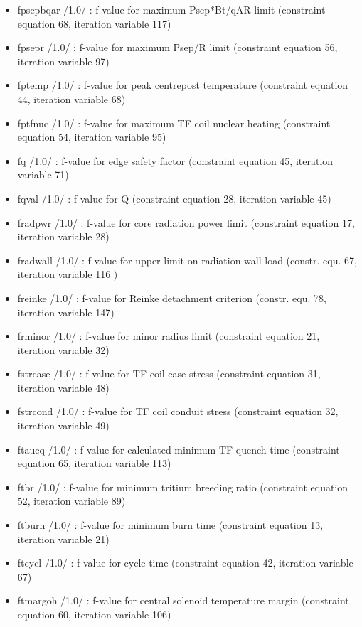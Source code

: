 \documentclass[
]{article}
\begin{document}
\begin{itemize}
\begin{itemize}
  \item
    fpsepbqar /1.0/ : f-value for maximum Psep*Bt/qAR limit (constraint
    equation 68, iteration variable 117)
  \item
    fpsepr /1.0/ : f-value for maximum Psep/R limit (constraint equation
    56, iteration variable 97)
  \item
    fptemp /1.0/ : f-value for peak centrepost temperature (constraint
    equation 44, iteration variable 68)
  \item
    fptfnuc /1.0/ : f-value for maximum TF coil nuclear heating
    (constraint equation 54, iteration variable 95)
  \item
    fq /1.0/ : f-value for edge safety factor (constraint equation 45,
    iteration variable 71)
  \item
    fqval /1.0/ : f-value for Q (constraint equation 28, iteration
    variable 45)
  \item
    fradpwr /1.0/ : f-value for core radiation power limit (constraint
    equation 17, iteration variable 28)
  \item
    fradwall /1.0/ : f-value for upper limit on radiation wall load
    (constr. equ. 67, iteration variable 116 )
  \item
    freinke /1.0/ : f-value for Reinke detachment criterion (constr.
    equ. 78, iteration variable 147)
  \item
    frminor /1.0/ : f-value for minor radius limit (constraint equation
    21, iteration variable 32)
  \item
    fstrcase /1.0/ : f-value for TF coil case stress (constraint
    equation 31, iteration variable 48)
  \item
    fstrcond /1.0/ : f-value for TF coil conduit stress (constraint
    equation 32, iteration variable 49)
  \item
    ftaucq /1.0/ : f-value for calculated minimum TF quench time
    (constraint equation 65, iteration variable 113)
  \item
    ftbr /1.0/ : f-value for minimum tritium breeding ratio (constraint
    equation 52, iteration variable 89)
  \item
    ftburn /1.0/ : f-value for minimum burn time (constraint equation
    13, iteration variable 21)
  \item
    ftcycl /1.0/ : f-value for cycle time (constraint equation 42,
    iteration variable 67)
  \item
    ftmargoh /1.0/ : f-value for central solenoid temperature margin
    (constraint equation 60, iteration variable 106)

\end{itemize}
\end{itemize}
\end{document}
